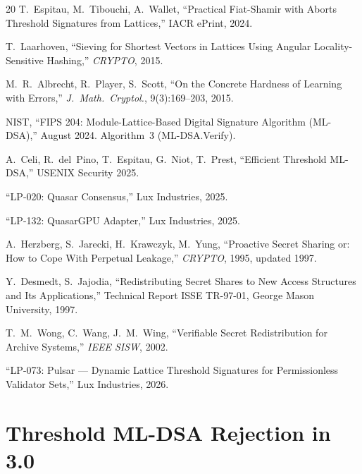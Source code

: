 \documentclass[11pt]{article}
\begin{document}
\begin{thebibliography}{20}
 T.~Espitau, M.~Tibouchi, A.~Wallet, ``Practical
  Fiat-Shamir with Aborts Threshold Signatures from Lattices,''
  IACR ePrint, 2024.

 T.~Laarhoven, ``Sieving for Shortest Vectors
  in Lattices Using Angular Locality-Sensitive Hashing,''
  \emph{CRYPTO}, 2015.

 M.~R.~Albrecht, R.~Player, S.~Scott,
  ``On the Concrete Hardness of Learning with Errors,''
  \emph{J.~Math.~Cryptol.}, 9(3):169--203, 2015.

 NIST, ``FIPS 204: Module-Lattice-Based
  Digital Signature Algorithm (ML-DSA),'' August 2024.
  Algorithm~3 (ML-DSA.Verify).

 A.~Celi, R.~del~Pino, T.~Espitau, G.~Niot,
  T.~Prest, ``Efficient Threshold ML-DSA,'' USENIX Security 2025.

 ``LP-020: Quasar Consensus,'' Lux Industries, 2025.

 ``LP-132: QuasarGPU Adapter,'' Lux Industries, 2025.

 A.~Herzberg, S.~Jarecki, H.~Krawczyk, M.~Yung,
  ``Proactive Secret Sharing or: How to Cope With Perpetual Leakage,''
  \emph{CRYPTO}, 1995, updated 1997.

 Y.~Desmedt, S.~Jajodia, ``Redistributing
  Secret Shares to New Access Structures and Its Applications,''
  Technical Report ISSE TR-97-01, George Mason University, 1997.

 T.~M.~Wong, C.~Wang, J.~M.~Wing, ``Verifiable
  Secret Redistribution for Archive Systems,''
  \emph{IEEE SISW}, 2002.

 ``LP-073: Pulsar --- Dynamic Lattice Threshold
  Signatures for Permissionless Validator Sets,'' Lux Industries, 2026.

\end{thebibliography}

\appendix

\section{Threshold ML-DSA Rejection in 3.0}
\label{app:tmldsa}
\end{document}
